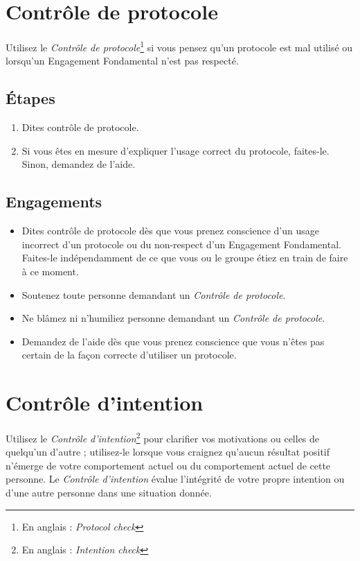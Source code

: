 \documentclass[paper=6in:9in,pagesize=pdftex,headinclude=on,footinclude=on,12pt]{scrbook}
\begin{document}
\section{Contrôle de protocole}

Utilisez le \emph{Contrôle de protocole}\footnote{En anglais : \emph{Protocol check}} si vous pensez qu'un protocole est mal utilisé
ou lorsqu'un Engagement Fondamental n'est pas respecté.

\subsection{Étapes}
\begin{enumerate}
	\item Dites \og{}contrôle de protocole\fg{}.
	\item Si vous êtes en mesure d'expliquer l'usage correct du protocole, faites-le. Sinon, demandez de l'aide.
\end{enumerate}

\subsection{Engagements}
\begin{itemize}
	\item Dites \og{}contrôle de protocole\fg{} dès que vous prenez con\-science d'un usage incorrect d'un protocole ou du non-respect
	      d'un Engagement Fondamental. Faites-le indépendamment de ce que vous ou le groupe étiez en train de faire à ce moment.
	\item Soutenez toute personne demandant un \emph{Contrôle de protocole}.
	\item Ne blâmez ni n'humiliez personne demandant un \emph{Con\-trôle de protocole}.
	\item Demandez de l'aide dès que vous prenez conscience que vous n'êtes pas certain de la façon correcte d'utiliser un protocole.
\end{itemize}

\section{Contrôle d'intention}

Utilisez le \emph{Contrôle d'intention}\footnote{En anglais : \emph{Intention check}} pour clarifier vos motivations ou celles de quelqu'un
d'autre ; utilisez-le lorsque vous craignez qu'aucun résultat positif n'émerge de votre comportement actuel ou du comportement actuel de
cette personne. Le \emph{Contrôle d'intention} évalue l'intégrité de votre propre intention ou d'une autre personne dans une situation donnée.
\end{document}
